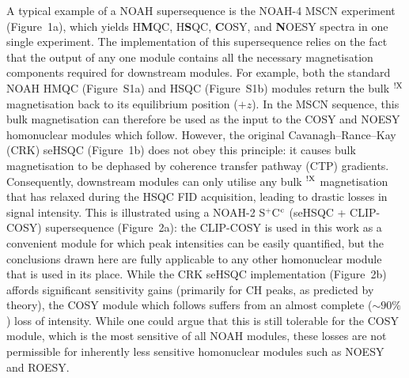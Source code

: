 \documentclass[final,twocolumn]{elsarticle}
\newcommand*{\noahCc}{C$\rm ^c$}
\newcommand*{\noahSp}{S$^+$}
\newcommand*{\carbon}{\ce{^{13}C}}
\newcommand*{\nitrogen}{\ce{^{15}N}}
\newcommand*{\magnnot}[1]{\ce{^1H}$^{!#1}$}
\begin{document}
A typical example of a NOAH supersequence is the NOAH-4 MSCN experiment (Figure~1a), which yields \nitrogen{} H\textbf{M}QC, \carbon{} H\textbf{S}QC, \textbf{C}OSY, and \textbf{N}OESY spectra in one single experiment.\cite{Kupce2017ACIE}
The implementation of this supersequence relies on the fact that the output of any one module contains all the necessary magnetisation components required for downstream modules.
For example, both the standard NOAH HMQC (Figure~S1a)\cite{Kupce2017ACIE, Kupce2007MRC} and HSQC (Figure~S1b)\cite{Kupce2017ACIE, SchulzeSunninghausen2017JMR} modules return the bulk \magnnot{\ce{X}} magnetisation back to its equilibrium position ($+z$).
In the MSCN sequence, this bulk magnetisation can therefore be used as the input to the COSY and NOESY homonuclear modules which follow.
However, the original Cavanagh--Rance--Kay (CRK) seHSQC (Figure~1b) does not obey this principle: it causes bulk magnetisation to be dephased by coherence transfer pathway (CTP) gradients.
Consequently, downstream modules can only utilise any bulk \magnnot{\ce{X}} magnetisation that has relaxed during the HSQC FID acquisition, leading to drastic losses in signal intensity.
This is illustrated using a NOAH-2 \noahSp{}\noahCc{} (seHSQC + CLIP-COSY\cite{Koos2016ACIE}) supersequence (Figure~2a): the CLIP-COSY is used in this work as a convenient module for which peak intensities can be easily quantified, but the conclusions drawn here are fully applicable to any other homonuclear module that is used in its place.
While the CRK seHSQC implementation (Figure~2b) affords significant sensitivity gains (primarily for CH peaks, as predicted by theory\cite{Schleucher1994JBNMR, Kontaxis1994JMR}), the COSY module which follows suffers from an almost complete ($\sim 90\%$) loss of intensity.
While one could argue that this is still tolerable for the COSY module, which is the most sensitive of all NOAH modules, these losses are not permissible for inherently less sensitive homonuclear modules such as NOESY and ROESY.
\end{document}
